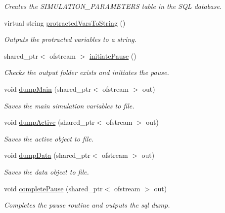 \begin{DoxyCompactItemize}
\begin{DoxyCompactList}\small\item\em Creates the S\+I\+M\+U\+L\+A\+T\+I\+O\+N\+\_\+\+P\+A\+R\+A\+M\+E\+T\+E\+RS table in the S\+QL database. \end{DoxyCompactList}\item 
virtual string \hyperlink{class_tree_aa8bb5d93c7992404ede0a49bb69ccd1f}{protracted\+Vars\+To\+String} ()
\begin{DoxyCompactList}\small\item\em Outputs the protracted variables to a string. \end{DoxyCompactList}\item 
shared\+\_\+ptr$<$ ofstream $>$ \hyperlink{class_tree_a3cd762da25ff2a313ccc21f4993918f5}{initiate\+Pause} ()
\begin{DoxyCompactList}\small\item\em Checks the output folder exists and initiates the pause. \end{DoxyCompactList}\item 
void \hyperlink{class_tree_aa2af00092c1b4595e91b3443a9abad1a}{dump\+Main} (shared\+\_\+ptr$<$ ofstream $>$ out)
\begin{DoxyCompactList}\small\item\em Saves the main simulation variables to file. \end{DoxyCompactList}\item 
void \hyperlink{class_tree_a9cf1e86171d4a0e22e636bb2cdb01e27}{dump\+Active} (shared\+\_\+ptr$<$ ofstream $>$ out)
\begin{DoxyCompactList}\small\item\em Saves the active object to file. \end{DoxyCompactList}\item 
void \hyperlink{class_tree_aef421096d19ced6d699b84b90a0a5bbc}{dump\+Data} (shared\+\_\+ptr$<$ ofstream $>$ out)
\begin{DoxyCompactList}\small\item\em Saves the data object to file. \end{DoxyCompactList}\item 
void \hyperlink{class_tree_abea4ba1f5340f9690b92008a3b049fba}{complete\+Pause} (shared\+\_\+ptr$<$ ofstream $>$ out)
\begin{DoxyCompactList}\small\item\em Completes the pause routine and outputs the sql dump. \end{DoxyCompactList}\item 

\end{DoxyCompactItemize}
